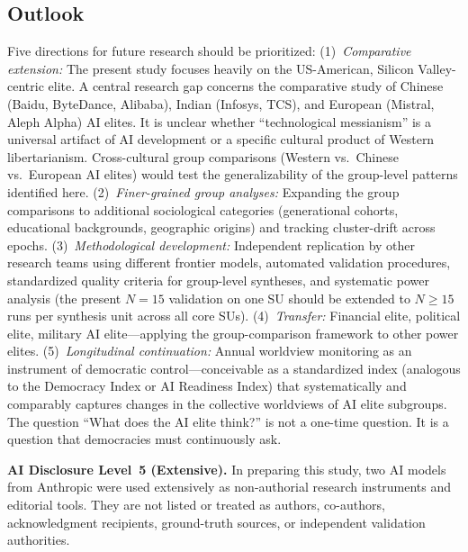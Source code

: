 \documentclass[12pt,a4paper]{article}
\begin{document}
\subsection{Outlook}

Five directions for future research should be prioritized: (1)~\emph{Comparative extension:} The present study focuses heavily on the US-American, Silicon Valley-centric elite. A central research gap concerns the comparative study of Chinese (Baidu, ByteDance, Alibaba), Indian (Infosys, TCS), and European (Mistral, Aleph Alpha) AI elites. It is unclear whether ``technological messianism'' is a universal artifact of AI development or a specific cultural product of Western libertarianism. Cross-cultural group comparisons (Western vs.\ Chinese vs.\ European AI elites) would test the generalizability of the group-level patterns identified here. (2)~\emph{Finer-grained group analyses:} Expanding the group comparisons to additional sociological categories (generational cohorts, educational backgrounds, geographic origins) and tracking cluster-drift across epochs. (3)~\emph{Methodological development:} Independent replication by other research teams using different frontier models, automated validation procedures, standardized quality criteria for group-level syntheses, and systematic power analysis (the present $N = 15$ validation on one SU should be extended to $N \geq 15$ runs per synthesis unit across all core SUs). (4)~\emph{Transfer:} Financial elite, political elite, military AI elite---applying the group-comparison framework to other power elites. (5)~\emph{Longitudinal continuation:} Annual worldview monitoring as an instrument of democratic control---conceivable as a standardized index (analogous to the Democracy Index or AI Readiness Index) that systematically and comparably captures changes in the collective worldviews of AI elite subgroups. The question ``What does the AI elite think?'' is not a one-time question. It is a question that democracies must continuously ask.


\begingroup
\small
{}
\setlength{\parskip}{0pt}
\smallskip
{}

\noindent\textbf{AI Disclosure Level~5 (Extensive).}
In preparing this study, two AI models from Anthropic were used extensively as non-authorial research instruments and editorial tools. They are not listed or treated as authors, co-authors, acknowledgment recipients, ground-truth sources, or independent validation authorities.
\end{document}
